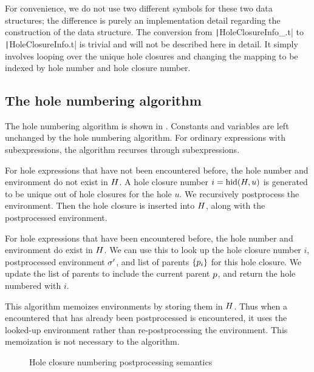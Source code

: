 For convenience, we do not use two different symbols for these two data structures; the difference is purely an implementation detail regarding the construction of the data structure. The conversion from \texttt|HoleClosureInfo_.t| to \texttt|HoleClosureInfo.t| is trivial and will not be described here in detail. It simply involves looping over the unique hole closures and changing the mapping to be indexed by hole number and hole closure number.

\subsection{The hole numbering algorithm}
\label{sec:hole-numbering-algorithm}

The hole numbering algorithm is shown in . Constants and variables are left unchanged by the hole numbering algorithm. For ordinary expressions with subexpressions, the algorithm recurses through subexpressions.

For hole expressions that have not been encountered before, the hole number and environment do not exist in $H$. A hole closure number $i=\operatorname{hid}(H,u)$ is generated to be unique out of hole closures for the hole $u$. We recursively postprocess the environment. Then the hole closure is inserted into $H$, along with the postprocessed environment.

For hole expressions that have been encountered before, the hole number and environment do exist in $H$. We can use this to look up the hole closure number $i$, postprocessed environment $\sigma'$, and list of parents $\{p_i\}$ for this hole closure. We update the list of parents to include the current parent $p$, and return the hole numbered with $i$.

This algorithm memoizes environments by storing them in $H$. Thus when a encountered that has already been postprocessed is encountered, it uses the looked-up environment rather than re-postprocessing the environment. This memoization is not necessary to the algorithm.

\begin{figure}
  \centering
  \begin{mdframed}
    \begin{singlespace}
      
    \end{singlespace}
  \end{mdframed}
  \caption{Hole closure numbering postprocessing semantics}
  \label{fig:big-step-renumber-new-rules}
\end{figure}

